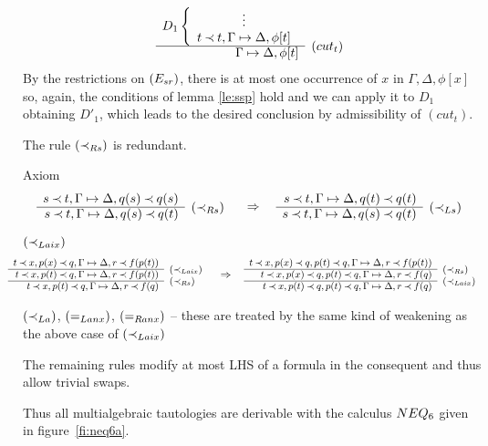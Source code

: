 \begin{PROOF}
\begin{LS}
\[\begin{array}{rl}
      D_1 \left \{ \begin{array}{c}
         \vdots \\
        t\Incl t,\GSD, \phi[t] \end{array} \right . \\ \cline{1-1}
     \GSD, \phi[t] & \rabove{(cut_t)} \end{array} 
\]
By the restrictions on $(E_{sr})$, there is at most one occurrence of $x$ in 
$\Gamma,\Delta,\phi[x]$ so, again, the
conditions of lemma \ref{le:ssp} hold and we can apply it to $D_1$ obtaining $D'_1$, 
which leads to the desired conclusion 
by admissibility of $(cut_t)$. \vspace*{-1ex}
\end{LS}
\end{PROOF}


\begin{LEMMA}\label{le:noiRs}
The rule $(\mathbin{\prec}_{Rs})$ is redundant.
\end{LEMMA}
\begin{PROOF}
\begin{LS}
\item Axiom
\[\prarc{
s\Incl t, \GSD, q(s)\Incl q(s) \cl
s\Incl t, \GSD, q(s)\Incl q(t) & \rabove{\iRs}
}\conv
\prarc{
s\Incl t, \GSD, q(t)\Incl q(t) \cl
s\Incl t, \GSD, q(s)\Incl q(t) & \rabove{\iLs}
}
\]
\item $(\mathbin{\prec}_{Laix})$
\[\sma{\prarc{
t\Incl x, p(x)\Incl q, \GSD, r\Incl f(p(t)) \cl
t\Incl x, p(t)\Incl q, \GSD, r\Incl f(p(t)) & \rabove{\Laix} \cl
t\Incl x, p(t)\Incl q, \GSD, r\Incl f(q) & \rabove{\iRs}
}\conv
\prarc{
t\Incl x, p(x)\Incl q, p(t)\Incl q, \GSD, r\Incl f(p(t)) \cl
t\Incl x, p(x)\Incl q, p(t)\Incl q, \GSD, r\Incl f(q) & \rabove{\iRs} \cl
t\Incl x, p(t)\Incl q, p(t)\Incl q, \GSD, r\Incl f(q) & \rabove{\Laix} 
} }
\]
\item $(\mathbin{\prec}_{La})$, $(=_{Lanx})$, $(=_{Ranx})$ -- these are treated by the same kind of weakening
as the above case of $(\mathbin{\prec}_{Laix})$
\item The remaining rules modify at most LHS of a formula in the consequent and thus
allow trivial swaps.
\end{LS}
\end{PROOF}

\noindent
Thus all multialgebraic tautologies are derivable with the calculus $NEQ_6$ given
in figure~\ref{fi:neq6a}.

